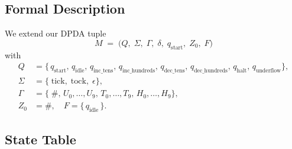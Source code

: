 \documentclass[11pt]{article}
\begin{document}
\subsection{Formal Description}

We extend our DPDA tuple 
\[
M \;=\;\bigl(Q,\;\Sigma,\;\Gamma,\;\delta,\;q_{\text{start}},\;Z_0,\;F\bigr)
\]
with
\[
\begin{aligned}
Q &= \{\,q_{\text{start}},\,q_{\text{idle}},\,q_{\text{inc\_tens}},\,q_{\text{inc\_hundreds}},\,q_{\text{dec\_tens}},\,q_{\text{dec\_hundreds}},\,q_{\text{halt}},\,q_{\text{underflow}}\},\\
\Sigma &= \{\;\text{tick},\;\text{tock},\;\epsilon\},\\
\Gamma &= \{\;\#,\,U_0,\dots,U_9,\,T_0,\dots,T_9,\,H_0,\dots,H_9\},\\
Z_0 &= \#, \quad F = \{\,q_{\text{idle}}\,\}.
\end{aligned}
\]

\subsection{State Table}
\end{document}
